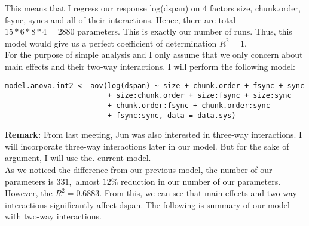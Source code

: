 \documentclass[11pt]{article}
\begin{document}
This means that I regress our response log(dspan) on $4$ factors size, chunk.order, fsync, syncs and all of their interactions. Hence, there are total $15*6*8*4=2880$ parameters. This is exactly our number of runs. Thus, this model would give us a perfect  coefficient of determination $R^2=1.$ \\
For the purpose of simple analysis and I only assume that we only concern about main effects and their two-way interactions. I will perform the following model:

\begin{verbatim}
model.anova.int2 <- aov(log(dspan) ~ size + chunk.order + fsync + sync
                        + size:chunk.order + size:fsync + size:sync
                        + chunk.order:fsync + chunk.order:sync
                        + fsync:sync, data = data.sys) 
\end{verbatim}
\textbf{Remark:} From last meeting, Jun was also interested in three-way interactions. I will incorporate three-way interactions later in our model. But for the sake of argument, I will use the. current model.\\

As we noticed the difference from our previous model, the number of our parameters is $331,$ almost $12\%$ reduction in our number of our parameters. However, the $R^2=0.6883.$ From this, we can see that main effects and two-way interactions significantly affect dspan. The following is summary of our model with two-way interactions. 
\end{document}
